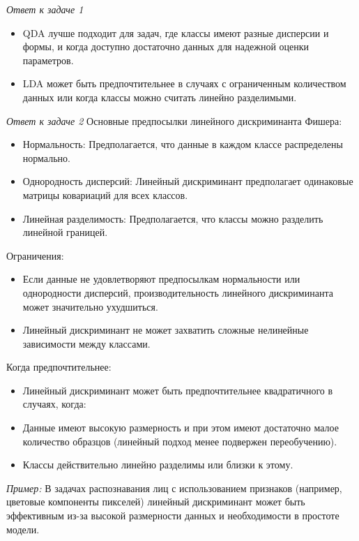 \textit{Ответ к задаче 1}
\begin{itemize}
    \item QDA лучше подходит для задач, где классы имеют разные дисперсии и формы, и когда доступно достаточно данных для надежной оценки параметров.

    \item LDA может быть предпочтительнее в случаях с ограниченным количеством данных или когда классы можно считать линейно разделимыми.
\end{itemize}

\textit{Ответ к задаче 2}
Основные предпосылки линейного дискриминанта Фишера:
\begin{itemize}
    \item Нормальность: Предполагается, что данные в каждом классе распределены нормально.

    \item Однородность дисперсий: Линейный дискриминант предполагает одинаковые матрицы ковариаций для всех классов.

    \item Линейная разделимость: Предполагается, что классы можно разделить линейной границей.
\end{itemize}
Ограничения:
\begin{itemize}
    \item Если данные не удовлетворяют предпосылкам нормальности или однородности дисперсий, производительность линейного дискриминанта может значительно ухудшиться.

    \item Линейный дискриминант не может захватить сложные нелинейные зависимости между классами.
\end{itemize}
Когда предпочтительнее:
\begin{itemize}
    \item Линейный дискриминант может быть предпочтительнее квадратичного в случаях, когда:

    \item Данные имеют высокую размерность и при этом имеют достаточно малое количество образцов (линейный подход менее подвержен переобучению).

    \item Классы действительно линейно разделимы или близки к этому.
\end{itemize}
\textit{Пример:} В задачах распознавания лиц с использованием признаков (например, цветовые компоненты пикселей) линейный дискриминант может быть эффективным из-за высокой размерности данных и необходимости в простоте модели.

